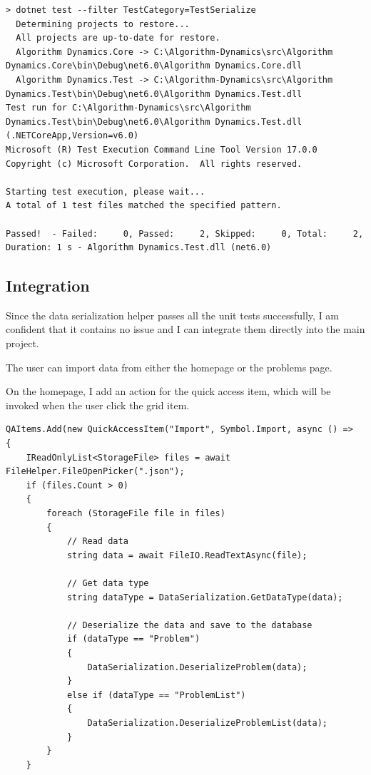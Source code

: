 \documentclass[a4paper]{report}
\begin{document}
\begin{verbatim}
> dotnet test --filter TestCategory=TestSerialize
  Determining projects to restore...
  All projects are up-to-date for restore.
  Algorithm Dynamics.Core -> C:\Algorithm-Dynamics\src\Algorithm Dynamics.Core\bin\Debug\net6.0\Algorithm Dynamics.Core.dll
  Algorithm Dynamics.Test -> C:\Algorithm-Dynamics\src\Algorithm Dynamics.Test\bin\Debug\net6.0\Algorithm Dynamics.Test.dll
Test run for C:\Algorithm-Dynamics\src\Algorithm Dynamics.Test\bin\Debug\net6.0\Algorithm Dynamics.Test.dll (.NETCoreApp,Version=v6.0)
Microsoft (R) Test Execution Command Line Tool Version 17.0.0
Copyright (c) Microsoft Corporation.  All rights reserved.

Starting test execution, please wait...
A total of 1 test files matched the specified pattern.

Passed!  - Failed:     0, Passed:     2, Skipped:     0, Total:     2, Duration: 1 s - Algorithm Dynamics.Test.dll (net6.0)
\end{verbatim}

\subsection{Integration}

Since the data serialization helper passes all the unit tests successfully, I am confident that it contains no issue and I can integrate them directly into the main project.

The user can import data from either the homepage or the problems page.

On the homepage, I add an action for the quick access item, which will be invoked when the user click the grid item.

\begin{verbatim}
QAItems.Add(new QuickAccessItem("Import", Symbol.Import, async () =>
{
    IReadOnlyList<StorageFile> files = await FileHelper.FileOpenPicker(".json");
    if (files.Count > 0)
    {
        foreach (StorageFile file in files)
        {
            // Read data
            string data = await FileIO.ReadTextAsync(file);

            // Get data type
            string dataType = DataSerialization.GetDataType(data);

            // Deserialize the data and save to the database
            if (dataType == "Problem")
            {
                DataSerialization.DeserializeProblem(data);
            }
            else if (dataType == "ProblemList")
            {
                DataSerialization.DeserializeProblemList(data);
            }
        }
    }
\end{verbatim}
\end{document}
